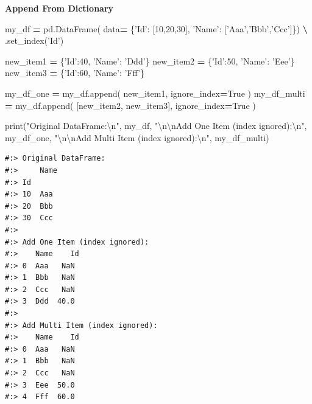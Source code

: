 \documentclass[
]{book}
\newenvironment{Shaded}{\begin{snugshade}}{\end{snugshade}}
\newcommand{\BuiltInTok}[1]{#1}
\newcommand{\CharTok}[1]{\textcolor[rgb]{0.5,0.5,0.5}{#1}}
\newcommand{\DecValTok}[1]{\textcolor[rgb]{0.06,0.06,0.06}{#1}}
\newcommand{\NormalTok}[1]{#1}
\newcommand{\OperatorTok}[1]{\textcolor[rgb]{0.43,0.43,0.43}{\textbf{#1}}}
\newcommand{\StringTok}[1]{\textcolor[rgb]{0.5,0.5,0.5}{#1}}
\newcommand{\VariableTok}[1]{\textcolor[rgb]{0,0,0}{#1}}
\begin{document}
\textbf{Append From Dictionary}

\begin{Shaded}
\begin{Highlighting}[]
\NormalTok{my_df }\OperatorTok{=}\NormalTok{ pd.DataFrame(}
\NormalTok{          data}\OperatorTok{=}\NormalTok{ \{}\StringTok{'Id'}\NormalTok{:   [}\DecValTok{10}\NormalTok{,}\DecValTok{20}\NormalTok{,}\DecValTok{30}\NormalTok{],}
                 \StringTok{'Name'}\NormalTok{: [}\StringTok{'Aaa'}\NormalTok{,}\StringTok{'Bbb'}\NormalTok{,}\StringTok{'Ccc'}\NormalTok{]\})  }\OperatorTok{\textbackslash{}}
\NormalTok{                 .set_index(}\StringTok{'Id'}\NormalTok{)}

\NormalTok{new_item1 }\OperatorTok{=}\NormalTok{ \{}\StringTok{'Id'}\NormalTok{:}\DecValTok{40}\NormalTok{, }\StringTok{'Name'}\NormalTok{: }\StringTok{'Ddd'}\NormalTok{\}}
\NormalTok{new_item2 }\OperatorTok{=}\NormalTok{ \{}\StringTok{'Id'}\NormalTok{:}\DecValTok{50}\NormalTok{, }\StringTok{'Name'}\NormalTok{: }\StringTok{'Eee'}\NormalTok{\}}
\NormalTok{new_item3 }\OperatorTok{=}\NormalTok{ \{}\StringTok{'Id'}\NormalTok{:}\DecValTok{60}\NormalTok{, }\StringTok{'Name'}\NormalTok{: }\StringTok{'Fff'}\NormalTok{\}}

\NormalTok{my_df_one   }\OperatorTok{=}\NormalTok{ my_df.append( new_item1, ignore_index}\OperatorTok{=}\VariableTok{True}\NormalTok{ )}
\NormalTok{my_df_multi }\OperatorTok{=}\NormalTok{ my_df.append( [new_item2, new_item3], ignore_index}\OperatorTok{=}\VariableTok{True}\NormalTok{ )}

\BuiltInTok{print}\NormalTok{(}\StringTok{"Original DataFrame:}\CharTok{\textbackslash{}n}\StringTok{"}\NormalTok{, my_df,}
      \StringTok{"}\CharTok{\textbackslash{}n\textbackslash{}n}\StringTok{Add One Item (index ignored):}\CharTok{\textbackslash{}n}\StringTok{"}\NormalTok{, my_df_one,}
      \StringTok{"}\CharTok{\textbackslash{}n\textbackslash{}n}\StringTok{Add Multi Item (index ignored):}\CharTok{\textbackslash{}n}\StringTok{"}\NormalTok{, my_df_multi)}
\end{Highlighting}
\end{Shaded}

\begin{verbatim}
#:> Original DataFrame:
#:>     Name
#:> Id     
#:> 10  Aaa
#:> 20  Bbb
#:> 30  Ccc 
#:> 
#:> Add One Item (index ignored):
#:>    Name    Id
#:> 0  Aaa   NaN
#:> 1  Bbb   NaN
#:> 2  Ccc   NaN
#:> 3  Ddd  40.0 
#:> 
#:> Add Multi Item (index ignored):
#:>    Name    Id
#:> 0  Aaa   NaN
#:> 1  Bbb   NaN
#:> 2  Ccc   NaN
#:> 3  Eee  50.0
#:> 4  Fff  60.0
\end{verbatim}
\end{document}
